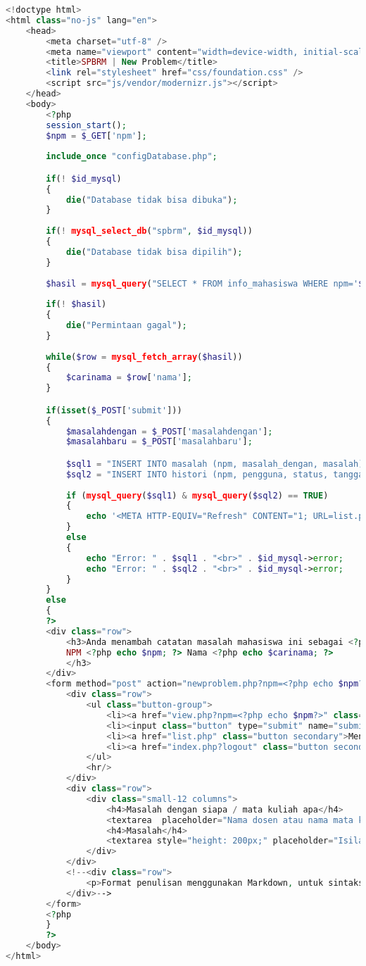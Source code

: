 \begin{lstlisting}[language=php,basicstyle=\tiny,caption=newproblem.php]
<!doctype html>
<html class="no-js" lang="en">
	<head>
		<meta charset="utf-8" />
		<meta name="viewport" content="width=device-width, initial-scale=1.0" />
		<title>SPBRM | New Problem</title>
		<link rel="stylesheet" href="css/foundation.css" />
		<script src="js/vendor/modernizr.js"></script>
	</head>
	<body>
		<?php
		session_start();
		$npm = $_GET['npm'];
		
		include_once "configDatabase.php";

		if(! $id_mysql)
		{
			die("Database tidak bisa dibuka");
		}
			
		if(! mysql_select_db("spbrm", $id_mysql))
		{
			die("Database tidak bisa dipilih");
		}
			
		$hasil = mysql_query("SELECT * FROM info_mahasiswa WHERE npm='$npm'", $id_mysql);
		
		if(! $hasil)
		{
			die("Permintaan gagal");
		}
		
		while($row = mysql_fetch_array($hasil))
		{
			$carinama = $row['nama'];
		}

		if(isset($_POST['submit']))
		{
			$masalahdengan = $_POST['masalahdengan'];
			$masalahbaru = $_POST['masalahbaru'];

			$sql1 = "INSERT INTO masalah (npm, masalah_dengan, masalah) VALUES ('$npm', '$masalahdengan', '$masalahbaru')";
			$sql2 = "INSERT INTO histori (npm, pengguna, status, tanggal_pembaruan, keterangan, catatan) VALUES ('$npm', '".$_SESSION['email']."', 'menambah catatan masalah', now(), '', '')";
			
			if (mysql_query($sql1) & mysql_query($sql2) == TRUE) 
			{
				echo '<META HTTP-EQUIV="Refresh" CONTENT="1; URL=list.php">';
			} 
			else
			{
				echo "Error: " . $sql1 . "<br>" . $id_mysql->error;
				echo "Error: " . $sql2 . "<br>" . $id_mysql->error;
			}
		}
		else
		{
		?>
		<div class="row">
			<h3>Anda menambah catatan masalah mahasiswa ini sebagai <?php echo $_SESSION['email']?>.<br/>
			NPM <?php echo $npm; ?> Nama <?php echo $carinama; ?>
			</h3>
		</div>
		<form method="post" action="newproblem.php?npm=<?php echo $npm?>">
			<div class="row">
				<ul class="button-group">
					<li><a href="view.php?npm=<?php echo $npm?>" class="button secondary">Kembali</a></li>
					<li><input class="button" type="submit" name="submit" value="Simpan"></li>
					<li><a href="list.php" class="button secondary">Menu Utama</a></li>
					<li><a href="index.php?logout" class="button secondary">Logout</a></li>
				</ul>
				<hr/>
			</div>
			<div class="row">
				<div class="small-12 columns">
					<h4>Masalah dengan siapa / mata kuliah apa</h4>
					<textarea  placeholder="Nama dosen atau nama mata kuliah yang bersangkutan" name="masalahdengan"></textarea>
					<h4>Masalah</h4>
					<textarea style="height: 200px;" placeholder="Isilah dengan masalah yang dimiliki mahasiswa ini" name="masalahbaru"></textarea>
				</div>
			</div>
			<!--<div class="row">
				<p>Format penulisan menggunakan Markdown, untuk sintaks Markdown dapat dilihat <a href='https://help.github.com/articles/github-flavored-markdown/' target="_blank">disini</a>.</p>
			</div>-->
		</form>
		<?php
		}
		?>
	</body>
</html>
\end{lstlisting}

